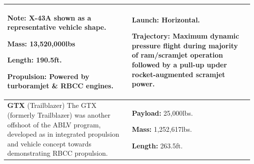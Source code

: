 {\begin{landscape}
\begin{xltabular}{\linewidth}{|X|X|X|}
			\textbf{Note:} X-43A shown as a representative vehicle shape.
			
			\textbf{Mass:} 13,520,000lbs
			
			\textbf{Length:} 190.5ft.
			
			\textbf{Propulsion:} Powered by turboramjet \& RBCC engines.
			
			&
			\small
			
			\textbf{Launch:} Horizontal. 
			
			\textbf{Trajectory:} Maximum dynamic pressure flight during majority of ram/scramjet operation followed by a pull-up upder rocket-augmented scramjet power. 
			\\ 
			\hline\small \textbf{GTX} (Trailblazer)\cite{Roche2000,Trefny1999} 
			\newline \newline 
			The GTX (formerly Trailblazer) was another offshoot of the ABLV program, developed as in integrated propulsion and vehicle concept towards demonstrating RBCC propulsion.
			&
			\small {} 
			
			\textbf{Payload:} 25,000lbs.
			
			\textbf{Mass:} 1,252,617lbs.
			
			\textbf{Length:} 263.5ft.
			

\end{xltabular}
\end{landscape}}
